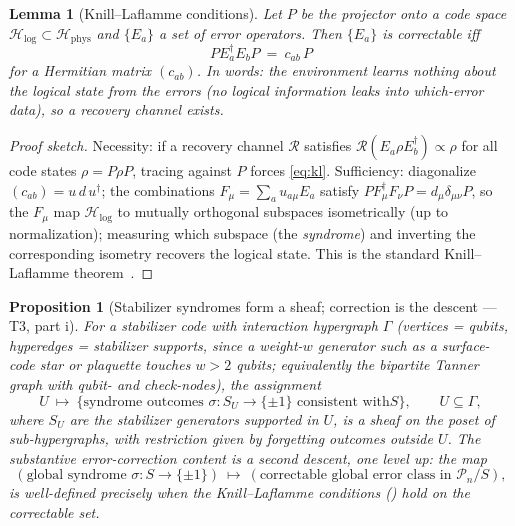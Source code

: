 \documentclass[12pt]{article}
\newtheorem{proposition}[theorem]{Proposition}
\newtheorem{lemma}[theorem]{Lemma}
\theoremstyle{definition}
\theoremstyle{remark}
\newcommand{\Ho}{\mathcal{H}}
\newcommand{\Hphys}{\Ho_{\mathrm{phys}}}
\newcommand{\Hlog}{\Ho_{\mathrm{log}}}
\newcommand{\Pauli}{\mathcal{P}}
\begin{document}
\begin{lemma}[Knill--Laflamme conditions]
\label{lem:knill-laflamme}
Let $P$ be the projector onto a code space $\Hlog\subset\Hphys$ and $\{E_a\}$ a set of
error operators. Then $\{E_a\}$ is correctable iff
\begin{equation}
P E_a^\dagger E_b P\ =\ c_{ab}\,P
\label{eq:kl}
\end{equation}
for a Hermitian matrix $(c_{ab})$. In words: the environment learns nothing about the
logical state from the errors (no logical information leaks into which-error data), so a
recovery channel exists.
\end{lemma}

\begin{proof}[Proof sketch]
Necessity: if a recovery channel $\mathcal R$ satisfies $\mathcal
R(E_a\rho E_b^\dagger)\propto\rho$ for all code states $\rho=P\rho P$, tracing against
$P$ forces \eqref{eq:kl}. Sufficiency: diagonalize $(c_{ab})=u\,d\,u^\dagger$; the
combinations $F_\mu=\sum_a u_{a\mu}E_a$ satisfy $PF_\mu^\dagger F_\nu P=d_\mu
\delta_{\mu\nu}P$, so the $F_\mu$ map $\Hlog$ to mutually orthogonal subspaces
isometrically (up to normalization); measuring which subspace (the \emph{syndrome}) and
inverting the corresponding isometry recovers the logical state. This is the standard
Knill--Laflamme theorem~\cite{KnillLaflamme}.
\end{proof}

\begin{proposition}[Stabilizer syndromes form a sheaf; correction is the descent --- T3, part i]
\label{prop:syndrome-presheaf}
For a stabilizer code with interaction hypergraph $\Gamma$ (vertices = qubits,
hyperedges = stabilizer supports, since a weight-$w$ generator such as a surface-code
star or plaquette touches $w>2$ qubits; equivalently the bipartite Tanner graph with
qubit- and check-nodes), the assignment
\[
U\ \longmapsto\ \{\text{syndrome outcomes } \sigma:S_U\to\{\pm1\}\text{ consistent with
} S\},\qquad U\subseteq\Gamma,
\]
where $S_U$ are the stabilizer generators supported in $U$, is a sheaf on the poset
of sub-hypergraphs, with restriction given by forgetting outcomes outside $U$. The
substantive error-correction content is a \emph{second} descent, one level up: the map
\[
(\text{global syndrome } \sigma:S\to\{\pm1\})\ \longmapsto\ (\text{correctable global
error class in }\Pauli_n/S),
\]
is well-defined precisely when the Knill--Laflamme conditions ()
hold on the correctable set.
\end{proposition}
\end{document}
